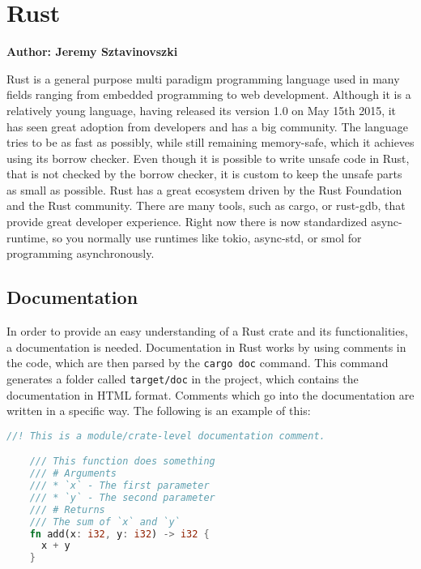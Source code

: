 \section{Rust}
\textbf{Author: Jeremy Sztavinovszki}

Rust is a general purpose multi paradigm programming language used in many fields ranging from embedded programming to web development. Although it is a relatively young language, having released its version 1.0 on May 15th 2015, it has seen great adoption from developers and has a big community. The language tries to be as fast as possibly, while still remaining memory-safe, which it achieves using its borrow checker. Even though it is possible to write unsafe code in Rust, that is not checked by the borrow checker, it is custom to keep the unsafe parts as small as possible.
Rust has a great ecosystem driven by the Rust Foundation and the Rust community. There are many tools, such as cargo, or rust-gdb, that provide great developer experience.
Right now there is now standardized async-runtime, so you normally use runtimes like tokio, async-std, or smol for programming asynchronously.

\subsection{Documentation}
In order to provide an easy understanding of a Rust crate and its functionalities, a documentation is needed.
Documentation in Rust works by using comments in the code, which are then parsed by the \verb+cargo doc+ command. 
This command generates a folder called \verb+target/doc+ in the project, which contains the documentation in HTML format.
Comments which go into the documentation are written in a specific way.
The following is an example of this: 

\begin{minipage}{\textwidth}
  \begin{lstlisting}[language=Rust, caption=Example of a Documentation Comment]
    //! This is a module/crate-level documentation comment.

    /// This function does something
    /// # Arguments
    /// * `x` - The first parameter
    /// * `y` - The second parameter
    /// # Returns
    /// The sum of `x` and `y`
    fn add(x: i32, y: i32) -> i32 {
      x + y
    }
  \end{lstlisting}
\end{minipage}

